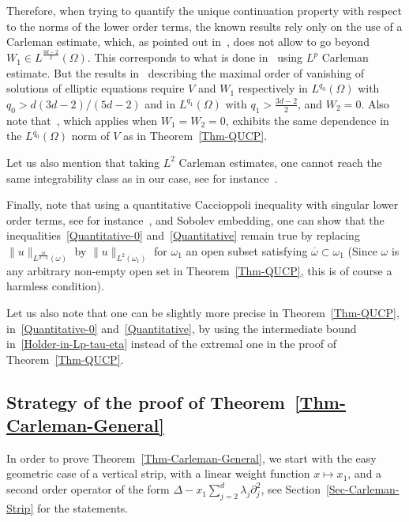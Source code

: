 \documentclass[10pt]{amsart}
\theoremstyle{definition}\newtheorem{defi}[theo]{Definition}\newtheorem{rema}[theo]{Remark}\newtheorem{exam}[theo]{Example}\newtheorem{exem}[theo]{Example}\newtheorem{nota}[theo]{Notation}
\begin{document}
Therefore, when trying to quantify the unique continuation property with respect to the norms of the lower order terms, the known results rely only on the use of a Carleman estimate, which, as pointed out in~\cite{barcelo1988weighted}, does not allow to go beyond $W_1 \in L^{\frac{3d-2}{2}}(\Omega)$. This corresponds to what is done in~\cite{davey2019quantitative,
davey2020quantitative} using $L^p$ Carleman estimate. But the results in~\cite{davey2019quantitative} describing the maximal order of vanishing of solutions of elliptic equations require $V$ and $W_1$ respectively in $L^{q_0}(\Omega)$ with $q_0 > d(3d-2)/(5d-2)$ and in $L^{q_1}(\Omega)$ with $q_1 > \frac{3d-2}{2}$, and $W_2=0$. Also note that~\cite[Theorem~1]{davey2020quantitative}, which applies when $W_1 = W_2 = 0$, exhibits the same dependence in the $L^{q_0}(\Omega)$ norm of $V$ as in Theorem~\ref{Thm-QUCP}.

Let us also mention that taking $L^2$ Carleman estimates, one cannot reach the same integrability class as in our case, see for instance~\cite{Duyckaerts2008}.

Finally, note that using a quantitative Caccioppoli inequality with singular lower order terms, see for instance~\cite[Lemma~5]{davey2019quantitative}, and Sobolev embedding, one can show that the inequalities~\eqref{Quantitative-0} and~\eqref{Quantitative} remain true by replacing $\|u \|_{L^{\frac{2d}{d-2}}(\omega)}$ by $\| u \|_{L^2(\omega_1)}$ for $\omega_1$ an open subset satisfying $\overline\omega \subset \omega_1$ (Since $\omega$ is any arbitrary non-empty open set in Theorem~\ref{Thm-QUCP}, this is of course a harmless condition).

Let us also note that one can be slightly more precise in Theorem~\ref{Thm-QUCP}, in~\eqref{Quantitative-0} and~\eqref{Quantitative}, by using the intermediate bound in~\eqref{Holder-in-Lp-tau-eta} instead of the extremal one in the proof of Theorem~\ref{Thm-QUCP}.


\subsection*{Strategy of the proof of Theorem~\ref{Thm-Carleman-General}}

In order to prove Theorem~\ref{Thm-Carleman-General}, we start with the easy geometric case of a vertical strip, with a linear weight function $x \mapsto x_1$, and a second order operator of the form $\Delta - x_1 \sum_{j = 2}^d \lambda_j \partial_{j}^2$, see Section~\ref{Sec-Carleman-Strip} for the statements.
\end{document}
